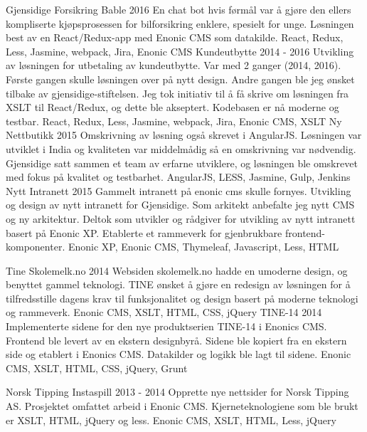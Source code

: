 \begin{cventries}
    \kunde
    {Gjensidige Forsikring} %
    \project
    {Bable}
    {2016}
    {En chat bot hvis førmål var å gjøre den ellers kompliserte kjøpsprosessen for bilforsikring enklere, spesielt for unge. Løsningen best av en React/Redux-app med Enonic CMS som datakilde.}
    {React, Redux, Less, Jasmine, webpack, Jira, Enonic CMS}
    \project
    {Kundeutbytte}
    {2014 - 2016}
    {Utvikling av løsningen for utbetaling av kundeutbytte. Var med 2 ganger (2014, 2016). Første gangen skulle løsningen over på nytt design. Andre gangen ble jeg ønsket tilbake av gjensidige-stiftelsen. Jeg tok initiativ til å få skrive om løsningen fra XSLT til React/Redux, og dette ble akseptert. Kodebasen er nå moderne og testbar.}
    {React, Redux, Less, Jasmine, webpack, Jira, Enonic CMS, XSLT}
    \project
    {Ny Nettbutikk}
    {2015}
    {Omskrivning av løsning også skrevet i AngularJS. Løsningen var utviklet i India og kvaliteten var middelmådig så en omskrivning var nødvendig. Gjensidige satt sammen et team av erfarne utviklere, og løsningen ble omskrevet med fokus på kvalitet og testbarhet.}
    {AngularJS, LESS, Jasmine, Gulp, Jenkins}
    \project
    {Nytt Intranett}
    {2015}
    {Gammelt intranett på enonic cms skulle fornyes. Utvikling og design av nytt intranett for Gjensidige. Som arkitekt anbefalte jeg nytt CMS og ny arkitektur. Deltok som utvikler og rådgiver for utvikling av nytt intranett basert på Enonic XP. Etablerte et rammeverk for gjenbrukbare frontend-komponenter.}
    {Enonic XP, Enonic CMS, Thymeleaf, Javascript, Less, HTML}


    \kunde
    {Tine} %
    \project
    {Skolemelk.no}
    {2014}
    {Websiden skolemelk.no hadde en umoderne design, og benyttet gammel teknologi. TINE ønsket å gjøre en redesign av løsningen for å tilfredsstille dagens krav til funksjonalitet og design basert på moderne teknologi og rammeverk.}
    {Enonic CMS, XSLT, HTML, CSS, jQuery}
    \project
    {TINE-14}
    {2014}
    {Implementerte sidene for den nye produktserien TINE-14 i Enonics CMS. Frontend ble levert av en ekstern designbyrå. Sidene ble kopiert fra en ekstern side og etablert i Enonics CMS. Datakilder og logikk ble lagt til sidene.}
    {Enonic CMS, XSLT, HTML, CSS, jQuery, Grunt}

    \kunde
    {Norsk Tipping} %
    \project
    {Instaspill}
    {2013 - 2014}
    {Opprette nye nettsider for Norsk Tipping AS. Prosjektet omfattet arbeid i Enonic CMS. Kjerneteknologiene som ble brukt er XSLT, HTML, jQuery og less.}
    {Enonic CMS, XSLT, HTML, Less, jQuery}


\end{cventries}
